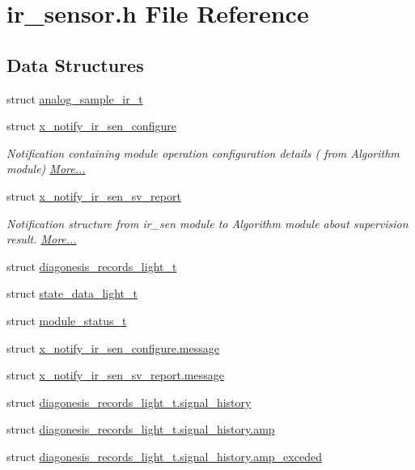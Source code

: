 \hypertarget{a00017}{\section{ir\+\_\+sensor.\+h File Reference}
\label{a00017}
}
\subsection*{Data Structures}
\begin{DoxyCompactItemize}
\item 
struct \hyperlink{a00017_d1/dd6/a00108}{analog\+\_\+sample\+\_\+ir\+\_\+t}
\item 
struct \hyperlink{a00017_d9/dbb/a00852}{x\+\_\+notify\+\_\+ir\+\_\+sen\+\_\+configure}
\begin{DoxyCompactList}\small\item\em Notification containing module operation configuration details ( from Algorithm module)  \hyperlink{a00017_d9/dbb/a00852}{More...}\end{DoxyCompactList}\item 
struct \hyperlink{a00017_d6/d2f/a00854}{x\+\_\+notify\+\_\+ir\+\_\+sen\+\_\+sv\+\_\+report}
\begin{DoxyCompactList}\small\item\em Notification structure from ir\+\_\+sen module to Algorithm module about supervision result.  \hyperlink{a00017_d6/d2f/a00854}{More...}\end{DoxyCompactList}\item 
struct \hyperlink{a00017_dd/dcb/a00375}{diagonesis\+\_\+records\+\_\+light\+\_\+t}
\item 
struct \hyperlink{a00017_d8/d7f/a00787}{state\+\_\+data\+\_\+light\+\_\+t}
\item 
struct \hyperlink{a00017_de/d94/a00603}{module\+\_\+status\+\_\+t}
\item 
struct \hyperlink{a00017_db/deb/a00853}{x\+\_\+notify\+\_\+ir\+\_\+sen\+\_\+configure.\+message}
\item 
struct \hyperlink{a00017_da/de6/a00855}{x\+\_\+notify\+\_\+ir\+\_\+sen\+\_\+sv\+\_\+report.\+message}
\item 
struct \hyperlink{a00017_d8/d95/a00379}{diagonesis\+\_\+records\+\_\+light\+\_\+t.\+signal\+\_\+history}
\item 
struct \hyperlink{a00017_d8/ddd/a00380}{diagonesis\+\_\+records\+\_\+light\+\_\+t.\+signal\+\_\+history.\+amp}
\item 
struct \hyperlink{a00017_de/d08/a00381}{diagonesis\+\_\+records\+\_\+light\+\_\+t.\+signal\+\_\+history.\+amp\+\_\+exceded}

\end{DoxyCompactItemize}
